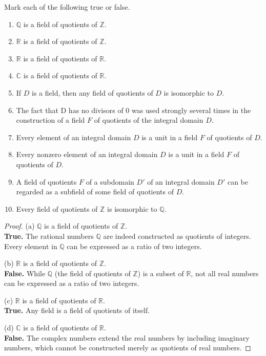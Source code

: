 \documentclass[12pt]{amsart}
\theoremstyle{definition}
\numberwithin{equation}{section}
\theoremstyle{plain}
\newcommand{\Z}{\mathbb{Z}}
\renewcommand{\C}{\mathbb{C}}
\newcommand{\R}{\mathbb{R}}
\newcommand{\Q}{\mathbb{Q}}
\begin{document}
\begin{exercise}{4} Mark each of the following true or false. \\
\begin{enumerate}[label=(\alph*.)]
    \item $\Q$ is a field of quotients of $\Z$.
    \item $\R$ is a field of quotients of $\Z$.
    \item $\R$ is a field of quotients of $\R$.
    \item $\C$ is a field of quotients of $\R$.
    \item If $D$ is a field, then any field of quotients of $D$ is isomorphic to $D$.
    \item The fact that D has no divisors of 0 was used strongly several times in the construction of a field $F$ of quotients of the integral domain $D$.
    \item Every element of an integral domain $D$ is a unit in a field $F$ of quotients of $D$.
    \item Every nonzero element of an integral domain $D$ is a unit in a field $F$ of quotients of $D$.
    \item A field of quotients $F$ of a subdomain $D\prime$ of an integral domain $D\prime$ can be regarded as a subfield of some field of quotients of $D$.
    \item Every field of quotients of $\Z$ is isomorphic to $\Q$.
\end{enumerate}
\begin{proof}

(a) \(\Q\) is a field of quotients of \(\Z\).\\
\textbf{True.} The rational numbers \(\Q\) are indeed constructed as quotients of integers. Every element in \(\Q\) can be expressed as a ratio of two integers.

(b) \(\R\) is a field of quotients of \(\Z\). \\
\textbf{False.} While \(\Q\) (the field of quotients of \(\Z\)) is a subset of \(\R\), not all real numbers can be expressed as a ratio of two integers.

(c) \(\R\) is a field of quotients of \(\R\). \\
\textbf{True.} Any field is a field of quotients of itself.

(d) \(\C\) is a field of quotients of \(\R\). \\
\textbf{False.} The complex numbers extend the real numbers by including imaginary numbers, which cannot be constructed merely as quotients of real numbers.


\end{proof}
\end{exercise}
\end{document}

